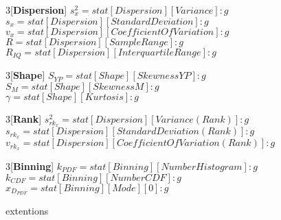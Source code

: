 \begin{{multicols}}{{3}}[\textbf{{Dispersion}}]
$ s^{{2}}_{{x}} = {stat[Dispersion][Variance]:g}$ \\
$ s_{{x}} = {stat[Dispersion][Standard Deviation]:g}$ \\
$ v_{{x}} = {stat[Dispersion][Coefficient Of Variation]:g}$ \\
$ R = {stat[Dispersion][Sample Range]:g}$ \\
$ R_{{IQ}} = {stat[Dispersion][Interquartile Range]:g}$
\end{{multicols}}

\begin{{multicols}}{{3}}[\textbf{{Shape}}]
$ S_{{YP}} = {stat[Shape][Skewness YP]:g}$ \\
$ S_{{M}} = {stat[Shape][Skewness M]:g}$ \\
$ \gamma = {stat[Shape][Kurtosis]:g}$
\end{{multicols}}

\begin{{multicols}}{{3}}[\textbf{{Rank}}]
$ s^{{2}}_{{rk_{{x}}}} = {stat[Dispersion][Variance (Rank)]:g}$ \\
$ s_{{rk_{{x}}}} = {stat[Dispersion][Standard Deviation (Rank)]:g} $ \\
$ v_{{rk_{{x}}}} = {stat[Dispersion][Coefficient Of Variation (Rank)]:g} $
\end{{multicols}}

\begin{{multicols}}{{3}}[\textbf{{Binning}}]
$ k_{{PDF}} = {stat[Binning][Number Histogram]:g} $ \\
$ k_{{CDF}} = {stat[Binning][Number CDF]:g}$ \\
$ x_{{D_{{PDF}}}} = {stat[Binning][Mode][0]:g}$
\end{{multicols}}

{extentions}